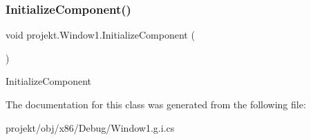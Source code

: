 \subsubsection{\texorpdfstring{Initialize\+Component()}{InitializeComponent()}}
{\footnotesize\ttfamily void projekt.\+Window1.\+Initialize\+Component (\begin{DoxyParamCaption}{ }\end{DoxyParamCaption})\hspace{0.3cm}{\ttfamily [inline]}}



Initialize\+Component 



The documentation for this class was generated from the following file\+:\begin{DoxyCompactItemize}
\item 
projekt/obj/x86/\+Debug/Window1.\+g.\+i.\+cs\end{DoxyCompactItemize}

